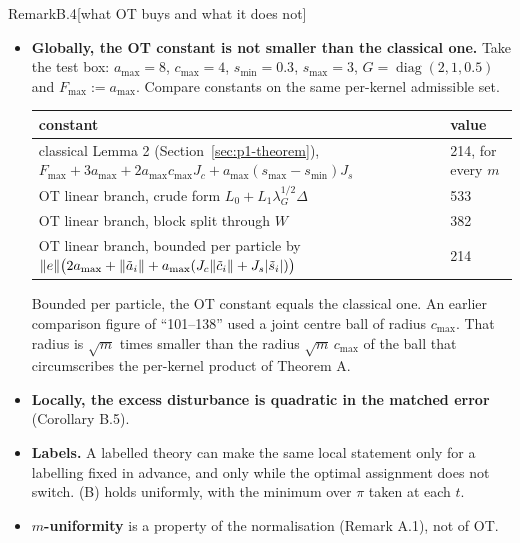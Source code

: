 \begin{rmk}{Remark}{B.4}[what OT buys and what it does not]
\leavevmode
\begin{itemize}
\item \textbf{Globally, the OT constant is not smaller than the classical one.} Take the test box: $a_{\max}=8$,
  $c_{\max}=4$, $s_{\min}=0.3$, $s_{\max}=3$, $G=\operatorname{diag}(2,1,0.5)$ and $F_{\max}:=a_{\max}$. Compare
  constants on the same per-kernel admissible set.
  \begin{center}
  \small
  \begin{tabularx}{\linewidth}{@{}Yl@{}}
  \toprule
  constant & value\\
  \midrule
  classical Lemma 2 (Section~\ref{sec:p1-theorem}),
    $F_{\max}+3a_{\max}+2a_{\max}c_{\max}J_c+a_{\max}(s_{\max}-s_{\min})J_s$ & 214, for every $m$\\
  OT linear branch, crude form $L_0+L_1\lambda_G^{1/2}\Delta$ & 533\\
  OT linear branch, block split through $W$ & 382\\
  OT linear branch, bounded per particle by
    $\lVert e\rVert\bigl(2a_{\max}+\lVert \tilde a_i\rVert+a_{\max}(J_c\lVert \tilde c_i\rVert+J_s\lvert \tilde s_i\rvert)\bigr)$ & 214\\
  \bottomrule
  \end{tabularx}
  \end{center}
  Bounded per particle, the OT constant equals the classical one. An earlier comparison figure of ``101--138'' used a
  joint centre ball of radius $c_{\max}$. That radius is $\sqrt m$ times smaller than the radius $\sqrt m\,c_{\max}$
  of the ball that circumscribes the per-kernel product of Theorem A.
\item \textbf{Locally, the excess disturbance is quadratic in the matched error} (Corollary B.5).
\item \textbf{Labels.} A labelled theory can make the same local statement only for a labelling fixed in advance,
  and only while the optimal assignment does not switch. (B) holds uniformly, with the minimum over $\pi$ taken at
  each $t$.
\item \textbf{$m$-uniformity} is a property of the normalisation (Remark A.1), not of OT.
\end{itemize}
\end{rmk}

